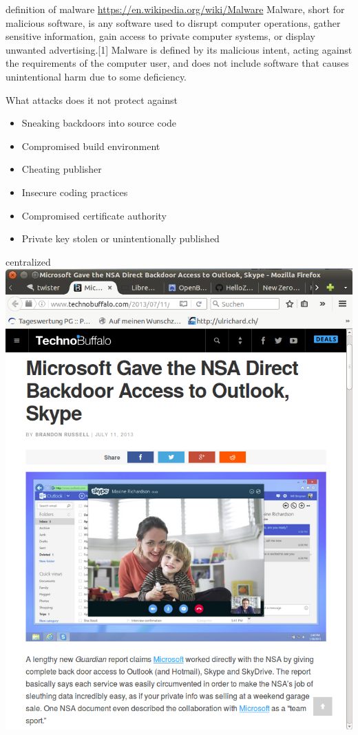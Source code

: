 \documentclass[11pt]{beamer}
\begin{document}
\begin{frame}{definition of malware}
\href{https://en.wikipedia.org/wiki/Malware}{https://en.wikipedia.org/wiki/Malware}
Malware, short for malicious software, is any software used to disrupt computer operations, gather sensitive information, gain access to private computer systems, or display unwanted advertising.[1] Malware is defined by its malicious intent, acting against the requirements of the computer user, and does not include software that causes unintentional harm due to some deficiency.
\end{frame}

\begin{frame}{What attacks does it not protect against}
\begin{itemize}
\item Sneaking backdoors into source code
\item Compromised build environment
\item Cheating publisher
\item Insecure coding practices
\item Compromised certificate authority
\item Private key stolen or unintentionally published
\end{itemize}
\end{frame}

\begin{frame}{centralized}
\includegraphics[scale=0.2]{skype.png}
\end{frame}
\end{document}
